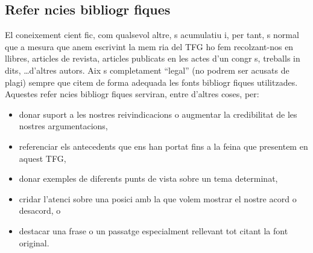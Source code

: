 \subsection{Refer ncies bibliogr fiques}

El coneixement cient fic, com qualsevol altre,  s acumulatiu i, per tant,  s normal que a mesura que anem escrivint la mem ria del TFG ho fem recolzant-nos en llibres, articles de revista, articles publicats en les actes d'un congr s, treballs in dits, \ldots d'altres autors. Aix   s completament ``legal'' (no podrem ser acusats de plagi) sempre que citem de forma adequada les fonts bibliogr fiques utilitzades. Aquestes refer ncies bibliogr fiques serviran, entre d'altres coses, per:
\begin{itemize}
   \item donar suport a les nostres reivindicacions o augmentar la credibilitat de les nostres argumentacions,
   \item referenciar els antecedents que ens han portat fins a la feina que presentem en aquest TFG,
   \item donar exemples de diferents punts de vista sobre un tema determinat,
   \item cridar l'atenci  sobre una posici  amb la que volem mostrar el nostre acord o desacord, o
   \item destacar una frase o un passatge especialment rellevant tot citant la font original.
\end{itemize}
